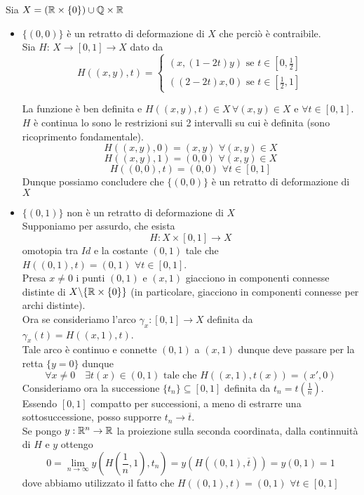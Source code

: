 \begin{ese}Sia $X=\left( \mathbb{R} \times \{0\} \right) \cup \mathbb{Q} \times \mathbb{R}$ 

\begin{itemize}
\item $\{(0,0)\}$ \`e un retratto di deformazione di $X$ che perci\`o \`e contraibile.\\

Sia $H : \, X\to [0,1] \to X $ dato da 
$$ H((x,y),t) = \begin{cases} (x, (1-2t)y) \text{ se } t \in \left[ 0, \frac{1}{2} \right] \\
((2-2t)x, 0) \text{ se } t \in \left[ \frac{1}{2},1 \right]
\end{cases}$$

La funzione \`e ben definita e $H((x,y),t) \in X \, \forall (x,y) \in X$ e $\forall t \in [0,1]$.\\
$H$ \`e continua lo sono le restrizioni sui 2 intervalli su cui \`e definita (sono ricoprimento fondamentale).\\
$$H((x,y),0)=(x,y)\, \, \forall (x,y) \in X$$
$$H((x,y),1)=(0,0)\, \, \forall (x,y) \in X$$
$$H((0,0),t)=(0,0)\, \, \forall t \in [0,1]$$
Dunque possiamo concludere che $\{(0,0)\}$ \`e un retratto di deformazione di $X$ 
\item $\{ (0,1)\}$ non \`e un retratto di deformazione di $X$\\
Supponiamo per assurdo, che esista $$H: X \times [0,1]\to X$$ omotopia tra $Id$ e la costante $(0,1)$ tale che $H((0,1), t)=(0,1)\, \, \forall t \in [0,1]$.\\
Presa $x\neq 0$ i punti $(0,1)$ e $ (x,1)$ giacciono in componenti connesse distinte di $X \backslash \{ \mathbb{R} \times \{ 0 \} \}$ (in particolare, giacciono in componenti connesse per archi distinte).\\
Ora se consideriamo l'arco $ \gamma_x:[0,1]\to X$ definita da $ \gamma_x(t)=H((x,1),t)$.\\
Tale arco \`e continuo e connette $(0,1)$ a $(x,1)$ dunque deve passare per la retta $\{ y=0\}$  dunque 
$$ \forall x \neq 0 \quad \exists t(x)\in (0,1) \text{  tale che } H((x,1),t(x)) = (x',0)$$
Consideriamo ora la successione $\{t_n\} \subseteq [0,1]$ definita da $t_n=t\left( \frac{1}{n} \right)$.\\
Essendo $[0,1]$ compatto per successioni, a meno di estrarre una sottosuccessione, posso supporre $t_n \to \overline{t}$.\\
Se pongo $y:\mathbb{R}^n \to \mathbb{R}$ la proiezione sulla seconda coordinata, dalla continnuit\`a di $H$ e $y$ ottengo
$$ 0 = \lim_{n \to \infty} y \left( H\left( \frac{1}{n},1 \right), t_n \right) =y \left( H((0,1),\overline{t}) \right)=y(0,1)=1$$
dove abbiamo utilizzato il fatto che $H((0,1),t)=(0,1)\, \, \forall t \in [0,1]$
\end{itemize}
\end{ese}
\newpage
